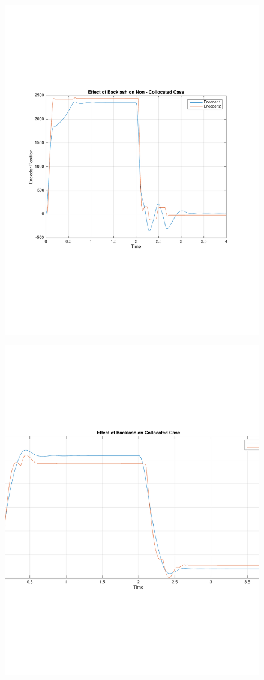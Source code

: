 \documentclass[11pt, a4paper]{article}
\begin{document}
\begin{figure}[H]
\centering
\includegraphics[width = \textwidth]{14.pdf}
\end{figure}
\begin{figure}[H]
\centering
\includegraphics[width = \textwidth]{15.pdf}
\end{figure}
\end{document}
